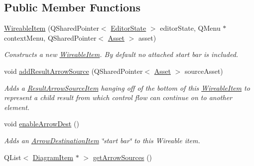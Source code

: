 \subsection*{Public Member Functions}
\begin{DoxyCompactItemize}
\item 
\hypertarget{class_wireable_item_a9eb97131f850caa212ca6e67e6bcd5ed}{\hyperlink{class_wireable_item_a9eb97131f850caa212ca6e67e6bcd5ed}{Wireable\-Item} (Q\-Shared\-Pointer$<$ \hyperlink{class_editor_state}{Editor\-State} $>$ editor\-State, Q\-Menu $\ast$context\-Menu, Q\-Shared\-Pointer$<$ \hyperlink{class_picto_1_1_asset}{Asset} $>$ asset)}\label{class_wireable_item_a9eb97131f850caa212ca6e67e6bcd5ed}

\begin{DoxyCompactList}\small\item\em Constructs a new \hyperlink{class_wireable_item}{Wireable\-Item}. By default no attached start bar is included. \end{DoxyCompactList}\item 
\hypertarget{class_wireable_item_ad15835918cd6ef56b2ac8147a898c8be}{void \hyperlink{class_wireable_item_ad15835918cd6ef56b2ac8147a898c8be}{add\-Result\-Arrow\-Source} (Q\-Shared\-Pointer$<$ \hyperlink{class_picto_1_1_asset}{Asset} $>$ source\-Asset)}\label{class_wireable_item_ad15835918cd6ef56b2ac8147a898c8be}

\begin{DoxyCompactList}\small\item\em Adds a \hyperlink{class_result_arrow_source_item}{Result\-Arrow\-Source\-Item} hanging off of the bottom of this \hyperlink{class_wireable_item}{Wireable\-Item} to represent a child result from which control flow can continue on to another element. \end{DoxyCompactList}\item 
void \hyperlink{class_wireable_item_ae5c0b483177a4671cc68182e34fab228}{enable\-Arrow\-Dest} ()
\begin{DoxyCompactList}\small\item\em Adds an \hyperlink{class_arrow_destination_item}{Arrow\-Destination\-Item} \char`\"{}start bar\char`\"{} to this Wireable item. \end{DoxyCompactList}\item 
\hypertarget{class_wireable_item_a17301f066713f101a8b857db9b8a16af}{Q\-List$<$ \hyperlink{class_diagram_item}{Diagram\-Item} $\ast$ $>$ \hyperlink{class_wireable_item_a17301f066713f101a8b857db9b8a16af}{get\-Arrow\-Sources} ()}\label{class_wireable_item_a17301f066713f101a8b857db9b8a16af}


\end{DoxyCompactItemize}

